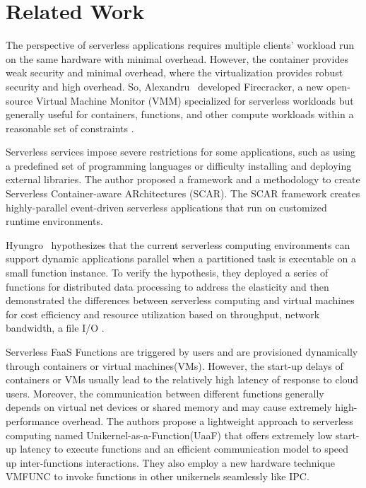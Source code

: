 \section*{Related Work}
\label{sec:related_work}

The perspective of serverless applications requires multiple clients' workload run on the same hardware with minimal overhead. However, the container provides weak security and minimal overhead, where the virtualization provides robust security and high overhead. So, Alexandru \etal\ developed Firecracker, a new open-source Virtual Machine Monitor (VMM) specialized for serverless workloads but generally useful for containers, functions, and other compute workloads within a reasonable set of constraints \cite{firecracker}.


Serverless services impose severe restrictions for some applications, such as using a predefined set of programming languages or difficulty installing and deploying external libraries. The author \cite{PEREZ201850} proposed a framework and a methodology to create Serverless Container-aware ARchitectures (SCAR). The SCAR framework creates highly-parallel event-driven serverless applications that run on customized runtime environments.

Hyungro \etal\ hypothesizes that the current serverless computing environments can support dynamic applications parallel when a partitioned task is executable on a small function instance. To verify the hypothesis, they deployed a series of functions for distributed data processing to address the elasticity and then demonstrated the differences between serverless computing and virtual machines for cost efficiency and resource utilization based on throughput, network bandwidth, a file I/O \cite{lee2018performance}. 

Serverless FaaS Functions are triggered by users and are provisioned dynamically through containers or virtual machines(VMs). However, the start-up delays of containers or VMs usually lead to the relatively high latency of response to cloud users. Moreover, the communication between different functions generally depends on virtual net devices or shared memory and may cause extremely high-performance overhead. The authors \cite{tan2020unikernel} propose a lightweight approach to serverless computing named Unikernel-as-a-Function(UaaF) that offers extremely low start-up latency to execute functions and an efficient communication model to speed up inter-functions interactions. They also employ a new hardware technique VMFUNC to invoke functions in other unikernels seamlessly like IPC.


